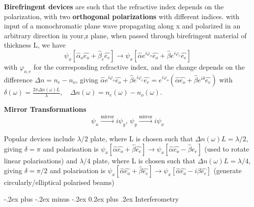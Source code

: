 \documentclass[a4paper,11pt,portrait]{article}
\makeatletter
\renewcommand{\section}{\@startsection{section}{1}{0mm}%
                            {-.2ex plus -.2ex minus -.2ex}%
                            {0.2ex plus .2ex}%
                            {\normalfont\tiny\bfseries}}
\makeatother
\begin{document}
\begin{multicols}{3}
\textbf{Birefringent devices} are such that the refractive index depends on the polarization, with two \textbf{orthogonal polarizations} with different indices. with input of a monochromatic plane wave propagating along x and polarized in an arbitrary direction in your,z plane, when passed through birefringent material of thickness L, we have
$$\psi_x \left[ \hat{\alpha}_o \hat{e_o} + \hat{\beta}_e \hat{e_e} \right] \rightarrow \psi_x [\hat{\alpha} e^{i\varphi_o} \hat{e_o} + \hat{\beta} e^{i\varphi_e} \hat{e_e}]$$ with $\varphi_{o,e}$ for the corresponding refractive index, and the change depends on the difference $\Delta n = n_e - n_o$, giving $\hat{\alpha} e^{i\varphi_o} \hat{e_o} + \hat{\beta} e^{i\varphi_e} \hat{e_e} = e^{i\varphi_o} \left( \hat{\alpha} \hat{e_o} + \hat{\beta} e^{i\delta} \hat{e_e} \right)$ with $
\delta(\omega) = \frac{2\pi \Delta n(\omega) L}{\lambda}, \quad \Delta n(\omega) = n_e(\omega) - n_o(\omega)$.

\textbf{Mirror Transformations}
$$\psi_x\overset{\text{mirror}}{\rightarrow}i\psi_y,\,\psi_y\overset{\text{mirror}}{\rightarrow}i\psi_x$$

Popular devices include $\lambda / 2$ plate, where L is chosen such that $\Delta n(\omega)L = \lambda /2$, giving $\delta = \pi$ and polarisation is $\psi_x \left[ \hat{\alpha} \hat{e_o} + \hat{\beta} \hat{e_e} \right] \rightarrow \psi_x \left[ \hat{\alpha} \hat{e_o} - \hat{\beta} \hat{e_e} \right]$ (used to rotate linear polarisations) and $\lambda / 4$ plate, where L is chosen such that $\Delta n(\omega)L = \lambda /4$, giving $\delta = \pi / 2$ and polarisation is $\psi_x \left[ \hat{\alpha} \hat{e_o} + \hat{\beta} \hat{e_e} \right] \rightarrow \psi_x \left[ \hat{\alpha} \hat{e_o} - i \beta \hat{e_e} \right]$ (generate circularly/elliptical polarised beams)


\section{Interferometry}

\end{multicols}
\end{document}
